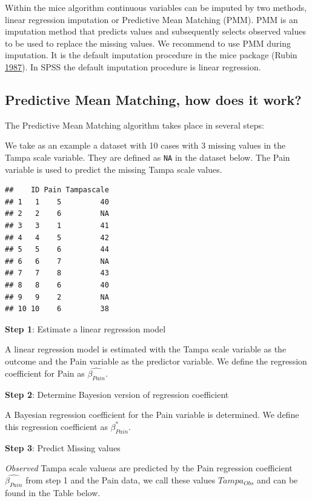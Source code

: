 \documentclass[
]{book}
\begin{document}
Within the mice algorithm continuous variables can be imputed by two
methods, linear regression imputation or Predictive Mean Matching (PMM).
PMM is an imputation method that predicts values and subsequently
selects observed values to be used to replace the missing values. We
recommend to use PMM during imputation. It is the default imputation
procedure in the mice package (Rubin
\protect\hyperlink{ref-Rubin1987}{1987}). In SPSS the default imputation
procedure is linear regression.

\hypertarget{predictive-mean-matching-how-does-it-work}{%
\subsection{Predictive Mean Matching, how does it
work?}\label{predictive-mean-matching-how-does-it-work}}

The Predictive Mean Matching algorithm takes place in several steps:

We take as an example a dataset with 10 cases with 3 missing values in
the Tampa scale variable. They are defined as \texttt{NA} in the dataset
below. The Pain variable is used to predict the missing Tampa scale
values.

\begin{verbatim}
##    ID Pain Tampascale
## 1   1    5         40
## 2   2    6         NA
## 3   3    1         41
## 4   4    5         42
## 5   5    6         44
## 6   6    7         NA
## 7   7    8         43
## 8   8    6         40
## 9   9    2         NA
## 10 10    6         38
\end{verbatim}

\textbf{Step 1}: Estimate a linear regression model

A linear regression model is estimated with the Tampa scale variable as
the outcome and the Pain variable as the predictor variable. We define
the regression coefficient for Pain as \(\hat{\beta_{Pain}}\).

\textbf{Step 2}: Determine Bayesion version of regression coefficient

A Bayesian regression coefficient for the Pain variable is determined.
We define this regression coefficient as \(\beta_{Pain}^*\).

\textbf{Step 3}: Predict Missing values

\emph{Observed} Tampa scale valueas are predicted by the Pain regression
coefficient \(\hat{\beta_{Pain}}\) from step 1 and the Pain data, we
call these values \(Tampa_{Obs}\) and can be found in the Table below.
\end{document}

